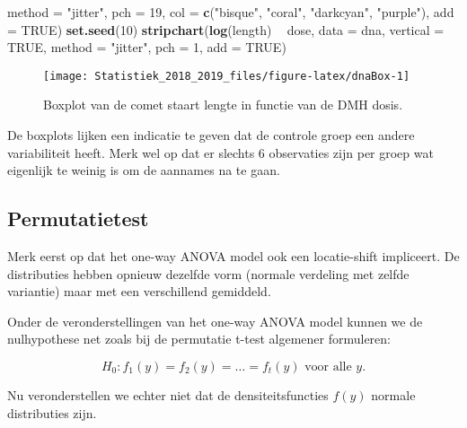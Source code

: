 \documentclass[12pt,dutch,coursenotes]{book}
\newenvironment{Shaded}{\begin{snugshade}}{\end{snugshade}}
\newcommand{\KeywordTok}[1]{\textcolor[rgb]{0.13,0.29,0.53}{\textbf{#1}}}
\newcommand{\DataTypeTok}[1]{\textcolor[rgb]{0.13,0.29,0.53}{#1}}
\newcommand{\DecValTok}[1]{\textcolor[rgb]{0.00,0.00,0.81}{#1}}
\newcommand{\StringTok}[1]{\textcolor[rgb]{0.31,0.60,0.02}{#1}}
\newcommand{\OtherTok}[1]{\textcolor[rgb]{0.56,0.35,0.01}{#1}}
\newcommand{\OperatorTok}[1]{\textcolor[rgb]{0.81,0.36,0.00}{\textbf{#1}}}
\newcommand{\NormalTok}[1]{#1}
\theoremstyle{definition}
\theoremstyle{definition}
\theoremstyle{definition}
\theoremstyle{remark}
\begin{document}
\begin{Shaded}
\begin{Highlighting}[]
    \DataTypeTok{method =} \StringTok{"jitter"}\NormalTok{, }\DataTypeTok{pch =} \DecValTok{19}\NormalTok{, }\DataTypeTok{col =} \KeywordTok{c}\NormalTok{(}\StringTok{"bisque"}\NormalTok{, }
        \StringTok{"coral"}\NormalTok{, }\StringTok{"darkcyan"}\NormalTok{, }\StringTok{"purple"}\NormalTok{), }\DataTypeTok{add =} \OtherTok{TRUE}\NormalTok{)}
\KeywordTok{set.seed}\NormalTok{(}\DecValTok{10}\NormalTok{)}
\KeywordTok{stripchart}\NormalTok{(}\KeywordTok{log}\NormalTok{(length) }\OperatorTok{~}\StringTok{ }\NormalTok{dose, }\DataTypeTok{data =}\NormalTok{ dna, }\DataTypeTok{vertical =} \OtherTok{TRUE}\NormalTok{, }
    \DataTypeTok{method =} \StringTok{"jitter"}\NormalTok{, }\DataTypeTok{pch =} \DecValTok{1}\NormalTok{, }\DataTypeTok{add =} \OtherTok{TRUE}\NormalTok{)}
\end{Highlighting}
\end{Shaded}

\begin{figure}

{\centering \texttt{[image: Statistiek\_2018\_2019\_files/figure-latex/dnaBox-1]} 

}

\caption{Boxplot van de comet staart lengte in functie van de DMH dosis.}\label{fig:dnaBox}
\end{figure}

De boxplots lijken een indicatie te geven dat de controle groep een
andere variabiliteit heeft. Merk wel op dat er slechts 6 observaties
zijn per groep wat eigenlijk te weinig is om de aannames na te gaan.

\subsection{Permutatietest}\label{permutatietest}

Merk eerst op dat het one-way ANOVA model ook een locatie-shift
impliceert. De distributies hebben opnieuw dezelfde vorm (normale
verdeling met zelfde variantie) maar met een verschillend gemiddeld.

Onder de veronderstellingen van het one-way ANOVA model kunnen we de
nulhypothese net zoals bij de permutatie t-test algemener formuleren:

\begin{equation*}
   H_0: f_1(y)=f_2(y) = \ldots = f_t(y) \text{ voor alle } y.
  \end{equation*}

Nu veronderstellen we echter niet dat de densiteitsfuncties \(f(y)\)
normale distributies zijn.
\end{document}
